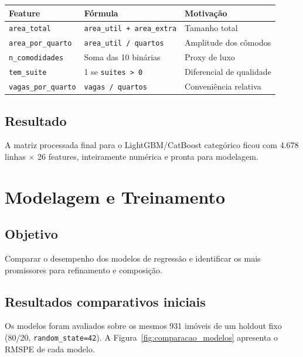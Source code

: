 \documentclass[12pt,a4paper]{article}
\begin{document}
\begin{table}[h]
\centering
\begin{tabular}{lll}
\toprule
\textbf{Feature} & \textbf{Fórmula} & \textbf{Motivação} \\
\midrule
\texttt{area\_total}       & \texttt{area\_util + area\_extra} & Tamanho total \\
\texttt{area\_por\_quarto} & \texttt{area\_util / quartos}     & Amplitude dos cômodos \\
\texttt{n\_comodidades}    & Soma das 10 binárias              & Proxy de luxo \\
\texttt{tem\_suite}        & 1 se \texttt{suites > 0}          & Diferencial de qualidade \\
\texttt{vagas\_por\_quarto}& \texttt{vagas / quartos}           & Conveniência relativa \\
\bottomrule
\end{tabular}
\end{table}

\subsection{Resultado}

A matriz processada final para o LightGBM/CatBoost categórico ficou com 4.678 linhas $\times$ 26 features, inteiramente numérica e pronta para modelagem.

\section{Modelagem e Treinamento}

\subsection{Objetivo}

Comparar o desempenho dos modelos de regressão e identificar os mais promissores para refinamento e composição.

\subsection{Resultados comparativos iniciais}

Os modelos foram avaliados sobre os mesmos 931 imóveis de um holdout fixo (80/20, \lstinline{random_state=42}). A Figura~\ref{fig:comparacao_modelos} apresenta o RMSPE de cada modelo.
\end{document}
